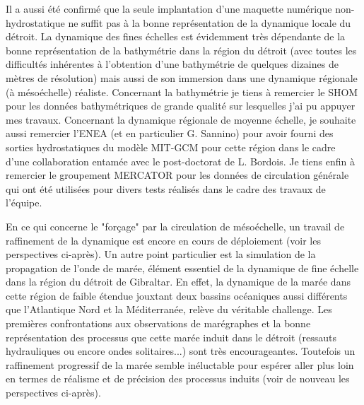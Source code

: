 Il a aussi été confirmé que la seule implantation d'une maquette numérique non-hydrostatique ne suffit pas à la bonne représentation de la dynamique locale du détroit. La dynamique des fines échelles est évidemment très dépendante de la bonne représentation de la bathymétrie dans la région du détroit (avec toutes les difficultés inhérentes à l'obtention d'une bathymétrie de quelques dizaines de mètres de résolution) mais aussi de son immersion dans une dynamique régionale (à mésoéchelle) réaliste. Concernant la bathymétrie je tiens à remercier le SHOM pour les données bathymétriques de grande qualité sur lesquelles j'ai pu appuyer mes travaux. Concernant la dynamique régionale de moyenne échelle, je souhaite aussi remercier l'ENEA (et en particulier G. Sannino) pour avoir fourni des sorties hydrostatiques du modèle MIT-GCM pour cette région dans le cadre d'une collaboration entamée avec le post-doctorat de L. Bordois. Je tiens enfin à remercier le groupement MERCATOR pour les données de circulation générale qui ont été utilisées pour divers tests réalisés dans le cadre des travaux de l'équipe.

En ce qui concerne le "forçage" par la circulation de mésoéchelle, un travail de raffinement de la dynamique est encore en cours de déploiement (voir les perspectives ci-après). Un autre point particulier est la simulation de la propagation de l'onde de marée, élément essentiel de la dynamique de fine échelle dans la région du détroit de Gibraltar. En effet, la dynamique de la marée dans cette région de faible étendue jouxtant deux bassins océaniques aussi différents que l'Atlantique Nord et la Méditerranée, relève du véritable challenge. Les premières confrontations aux observations de marégraphes et la bonne représentation des processus que cette marée induit dans le détroit (ressauts hydrauliques ou encore ondes solitaires...) sont très encourageantes. Toutefois un raffinement progressif de la marée semble inéluctable pour espérer aller plus loin en termes de réalisme et de précision des processus induits (voir de nouveau les perspectives ci-après).



